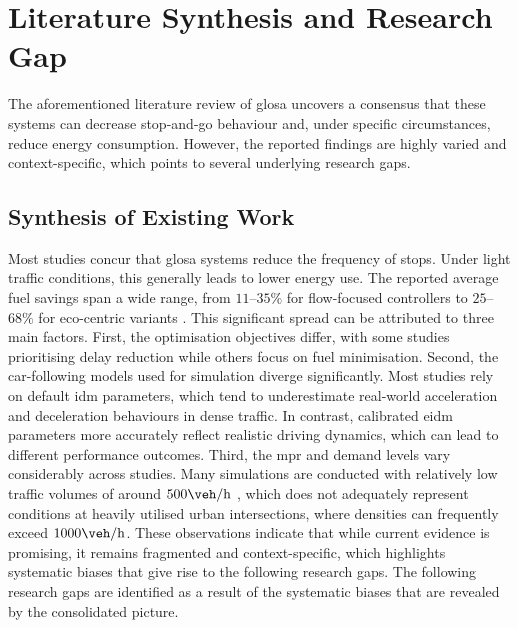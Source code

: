 \section{Literature Synthesis and Research Gap}
\label{sec:research_gap}

The aforementioned literature review of \ac{glosa} uncovers a consensus that these systems can decrease stop-and-go behaviour and, under specific circumstances, reduce energy consumption. However, the reported findings are highly varied and context-specific, which points to several underlying research gaps.

\subsection{Synthesis of Existing Work}
Most studies concur that \ac{glosa} systems reduce the frequency of stops. Under light traffic conditions, this generally leads to lower energy use. The reported average fuel savings span a wide range, from $11$--$35\%$ for flow-focused controllers to $25$--$68\%$ \cite{Guo2019,Typaldos2023,Cai2008} for eco-centric variants \cite{Park2024,Pulvirenti2023,Dong2024}. This significant spread can be attributed to three main factors. First, the optimisation objectives differ, with some studies prioritising delay reduction while others focus on fuel minimisation. Second, the car-following models used for simulation diverge significantly. Most studies rely on default \ac{idm} parameters, which tend to underestimate real-world acceleration and deceleration behaviours in dense traffic. In contrast, calibrated \ac{eidm} parameters more accurately reflect realistic driving dynamics, which can lead to different performance outcomes. Third, the \ac{mpr} and demand levels vary considerably across studies. Many simulations are conducted with relatively low traffic volumes of around $500\unit{\veh\per\hour}$ \cite{Yang2017, Ala2016}, which does not adequately represent conditions at heavily utilised urban intersections, where densities can frequently exceed $1000\unit{\veh\per\hour}$. These observations indicate that while current evidence is promising, it remains fragmented and context-specific, which highlights systematic biases that give rise to the following research gaps.
\mynewline
The following research gaps are identified as a result of the systematic biases that are revealed by the consolidated picture.

